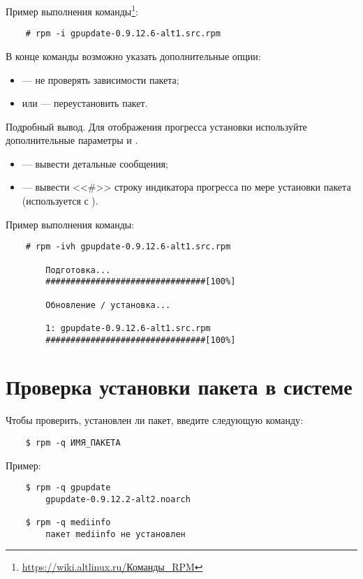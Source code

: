 
Пример выполнения команды\footnote{\href{https://wiki.altlinux.ru/\%D0\%9A\%D0\%BE\%D0\%BC\%D0\%B0\%D0\%BD\%D0\%B4\%D1\%8B_RPM}{https://wiki.altlinux.ru/Команды\_RPM}}:

\begin{verbatim}
    # rpm -i gpupdate-0.9.12.6-alt1.src.rpm
\end{verbatim}

В конце команды возможно указать дополнительные опции:
\begin{itemize}
	\item {} --- не проверять зависимости пакета;
	\item {} или  --- переустановить пакет.
\end{itemize}

Подробный вывод.
Для отображения прогресса установки используйте дополнительные параметры  и .
\begin{itemize}
	\item {} --- вывести детальные сообщения;
	\item {} --- вывести <<\#>> строку индикатора прогресса по мере установки пакета (используется с ).
\end{itemize}

Пример выполнения команды:
\begin{verbatim}
    # rpm -ivh gpupdate-0.9.12.6-alt1.src.rpm

        Подготовка...
        ################################[100%]

        Обновление / установка...

        1: gpupdate-0.9.12.6-alt1.src.rpm
        ################################[100%]
\end{verbatim}


\section{Проверка установки пакета в системе}\label{verifying-package}
Чтобы проверить, установлен ли пакет, введите следующую команду:
\begin{verbatim}
    $ rpm -q ИМЯ_ПАКЕТА
\end{verbatim}

Пример:
\begin{verbatim}
    $ rpm -q gpupdate
        gpupdate-0.9.12.2-alt2.noarch

    $ rpm -q mediinfo
        пакет mediinfo не установлен
\end{verbatim}

